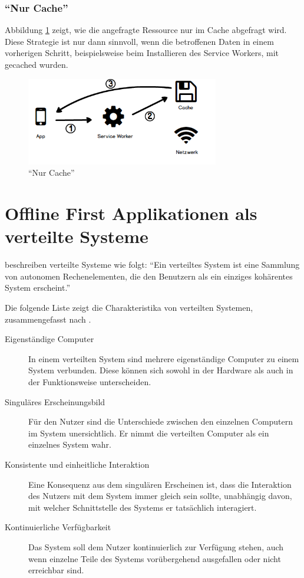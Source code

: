 \documentclass[a4paper, 12pt]{scrreprt}
\begin{document}
\subsubsection{\enquote{Nur Cache}}
Abbildung \ref{fig:cachingCacheOnly} zeigt, wie die angefragte Ressource nur im Cache abgefragt wird. Diese Strategie ist nur dann sinnvoll, wenn die betroffenen Daten in einem vorherigen Schritt, beispielsweise beim Installieren des Service Workers, mit gecached wurden.

\begin{figure}[h]
	\centering
	\includegraphics[width=0.75\textwidth]{cacheonly.png}
	\caption{\enquote{Nur Cache}}
	\label{fig:cachingCacheOnly}
\end{figure}

\section{Offline First Applikationen als verteilte Systeme}\label{sec:OfflineFirstVerteiteSysteme}
\citet{ArticleDistributedSystems} beschreiben verteilte Systeme wie folgt: \enquote{Ein verteiltes System ist eine Sammlung von autonomen Rechenelementen, die den Benutzern als ein einziges kohärentes System erscheint.}

Die folgende Liste zeigt die Charakteristika von verteilten Systemen, zusammengefasst nach \citet{BookDistributedSystemsDefinition}.

\begin{description}
\item[Eigenständige Computer] In einem verteilten System sind mehrere eigenständige Computer zu einem System verbunden. Diese können sich sowohl in der Hardware als auch in der Funktionsweise unterscheiden. 
\item[Singuläres Erscheinungsbild] Für den Nutzer sind die Unterschiede zwischen den einzelnen Computern im System unersichtlich. Er nimmt die verteilten Computer als ein einzelnes System wahr. 
\item[Konsistente und einheitliche Interaktion]
	Eine Konsequenz aus dem singulären Erscheinen ist, dass die Interaktion des Nutzers mit dem System immer gleich sein sollte, unabhängig davon, mit welcher Schnittstelle des Systems er tatsächlich interagiert. 
\item[Kontinuierliche Verfügbarkeit]
	Das System soll dem Nutzer kontinuierlich zur Verfügung stehen, auch wenn einzelne Teile des Systems vorübergehend ausgefallen oder nicht erreichbar sind.
\end{description}
\label{tab:charakteristikaDistributedSystem}
\end{document}
